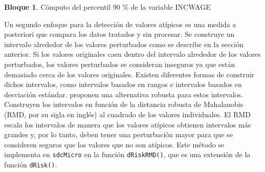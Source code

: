 \documentclass[]{book}
\newenvironment{Shaded}{\begin{snugshade}}{\end{snugshade}}
\newcommand{\CommentTok}[1]{\textcolor[rgb]{0.56,0.35,0.01}{\textit{#1}}}
\newcommand{\DataTypeTok}[1]{\textcolor[rgb]{0.13,0.29,0.53}{#1}}
\newcommand{\FloatTok}[1]{\textcolor[rgb]{0.00,0.00,0.81}{#1}}
\newcommand{\KeywordTok}[1]{\textcolor[rgb]{0.13,0.29,0.53}{\textbf{#1}}}
\newcommand{\NormalTok}[1]{#1}
\newcommand{\OperatorTok}[1]{\textcolor[rgb]{0.81,0.36,0.00}{\textbf{#1}}}
\newcommand{\OtherTok}[1]{\textcolor[rgb]{0.56,0.35,0.01}{#1}}
\newcommand{\StringTok}[1]{\textcolor[rgb]{0.31,0.60,0.02}{#1}}
\theoremstyle{definition}
\theoremstyle{definition}
\newtheorem{example}{Bloque}[chapter]
\theoremstyle{definition}
\theoremstyle{definition}
\theoremstyle{remark}
\begin{document}
\begin{example}
\protect\hypertarget{exm:bloqueMR8}{}{\label{exm:bloqueMR8} }Cómputo del percentil 90 \% de la variable INCWAGE
\end{example}

\begin{Shaded}
\end{Shaded}

Un segundo enfoque para la detección de valores atípicos es una medida a posteriori que compara los datos tratados y sin procesar. Se construye un intervalo alrededor de los valores perturbados como se describe en la sección anterior. Si los valores originales caen dentro del intervalo alrededor de los valores perturbados, los valores perturbados se consideran inseguros ya que están demasiado cerca de los valores originales. Existen diferentes formas de construir dichos intervalos, como intervalos basados en rangos e intervalos basados en desviación estándar. \citet{templ2008} proponen una alternativa robusta para estos intervalos. Construyen los intervalos en función de la distancia robusta de Mahalanobis (RMD, por su sigla en inglés) al cuadrado de los valores individuales. El RMD escala los intervalos de manera que los valores atípicos obtienen intervalos más grandes y, por lo tanto, deben tener una perturbación mayor para que se consideren seguros que los valores que no son atípicos. Este método se implementa en \texttt{sdcMicro} en la función \texttt{dRiskRMD()}, que es una extensión de la función \texttt{dRisk()}.
\end{document}
